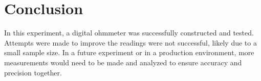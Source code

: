\documentclass[12pt]{article}
\begin{document}
\pagebreak

\section*{Conclusion}

In this experiment, a digital ohmmeter was successfully constructed and tested.
Attempts were made to improve the readings were not successful, likely 
due to a small sample size. In a future experiment or in a production 
environment, more measurements would need to be made and analyzed to 
ensure accuracy and precision together.
\end{document}
